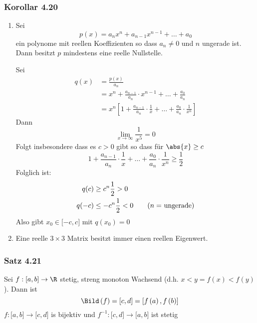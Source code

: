 \subsubsection*{Korollar 4.20}
\begin{enumerate}
\item Sei
\[p\left( x \right) = {a_n}{x^n} + {a_{n - 1}}{x^{n - 1}} +  \ldots  + {a_0}\]
ein polynome mit reellen Koeffizienten so dass $a_n\not=0$ und $n$ ungerade ist. Dann besitzt $p$ mindestens eine reelle Nullstelle.
\begin{beweis}{}
Sei 
\begin{align*}
q(x) &= \frac{{p(x)}}{{{a_n}}}\\
 &= {x^n} + \frac{{{a_{n - 1}}}}{{{a_n}}} \cdot {x^{n - 1}} +  \ldots  + \frac{{{a_0}}}{{{a_n}}}\\
 &= {x^n}\left[ {1 + \frac{{{a_{n - 1}}}}{{{a_n}}} \cdot \frac{1}{x} +  \ldots  + \frac{{{a_0}}}{{{a_n}}} \cdot \frac{1}{{{x^n}}}} \right]
\end{align*}
Dann
\[\mathop {\lim }\limits_{x \to \infty } \frac{1}{{{x^5}}} = 0\]
Folgt insbesondere dass es $c>0$ gibt so dass für $\abs{x}\geq c$ 
\[1 + \frac{{{a_{n - 1}}}}{{{a_n}}} \cdot \frac{1}{x} +  \ldots  + \frac{{{a_0}}}{{{a_n}}} \cdot \frac{1}{{{x^n}}} \ge \frac{1}{2}\]
Folglich ist:
\begin{align*}
q(c) &\ge {c^n}\frac{1}{2} > 0\\
q( - c) &\le  - {c^n}\frac{1}{2} < 0\tag{\text{$n=$ ungerade}}
\end{align*}
Also gibt $x_0\in\lbrack -c,c\rbrack$ mit $q\left( x_0\right)=0$
\end{beweis}
\item Eine reelle $3\times 3$ Matrix besitzt immer einen reellen Eigenwert.
\end{enumerate}

\subsubsection*{Satz 4.21}
Sei $f:\lbrack a,b\rbrack\to\R$ stetig, streng monoton Wachsend (d.h. $x<y=f(x)<f\left( y\right)$). Dann ist 
\[\Bild\left( f\right)=\lbrack c,d\rbrack=\left[ f\left( a\right), f\left( b\right)\right]\]
$f:\lbrack a,b\rbrack\to\lbrack c,d\rbrack$ is bijektiv und $f^{-1}:\lbrack c,d\rbrack\to\lbrack a,b\rbrack$ ist stetig

